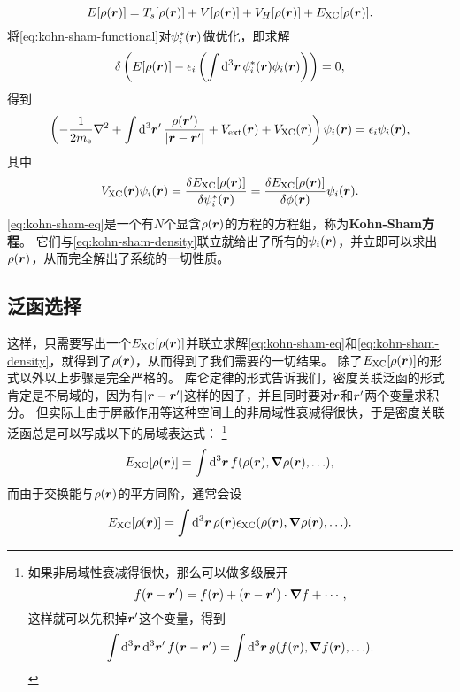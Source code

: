 \documentclass[hyperref, UTF8, a4paper]{ctexart}
\begin{document}
\begin{equation}
    E[\rho(\vb*{r})] = T_s[\rho(\vb*{r})] + V[\rho(\vb*{r})] + V_H[\rho(\vb*{r})] + E_\text{XC} [\rho(\vb*{r})].
    \label{eq:kohn-sham-functional}
\end{equation}
将\eqref{eq:kohn-sham-functional}对$\psi_i^*(\vb*{r})$做优化，即求解
\[
    \var \left( E[\rho(\vb*{r})] - \epsilon_i \left( \int \dd[3]{\vb*{r}} \phi_i^*(\vb*{r}) \phi_i(\vb*{r}) \right) \right) = 0,
\]
得到
\begin{equation}
    \left( - \frac{1}{2 m_\text{e}} \laplacian + \int \dd[3]{\vb*{r}'} \frac{\rho(\vb*{r}')}{\abs{\vb*{r} - \vb*{r}'}} + V_\text{ext}(\vb*{r}) + V_\text{XC}(\vb*{r}) \right) \psi_i(\vb*{r}) = \epsilon_i \psi_i(\vb*{r}),
    \label{eq:kohn-sham-eq}
\end{equation}
其中
\begin{equation}
    V_\text{XC}(\vb*{r}) \psi_i(\vb*{r}) = \fdv{E_\text{XC}[\rho(\vb*{r})]}{\psi^*_i(\vb*{r})} = \fdv{E_\text{XC}[\rho(\vb*{r})]}{\phi(\vb*{r})} \psi_i(\vb*{r}).
\end{equation}
\eqref{eq:kohn-sham-eq}是一个有$N$个显含$\rho(\vb*{r})$的方程的方程组，称为\textbf{Kohn-Sham方程}。
它们与\eqref{eq:kohn-sham-density}联立就给出了所有的$\psi_i(\vb*{r})$，并立即可以求出$\rho(\vb*{r})$，从而完全解出了系统的一切性质。

\subsection{泛函选择}

这样，只需要写出一个$E_\text{XC}[\rho(\vb*{r})]$并联立求解\eqref{eq:kohn-sham-eq}和\eqref{eq:kohn-sham-density}，就得到了$\rho(\vb*{r})$，从而得到了我们需要的一切结果。
除了$E_\text{XC}[\rho(\vb*{r})]$的形式以外以上步骤是完全严格的。
库仑定律的形式告诉我们，密度关联泛函的形式肯定是不局域的，因为有$\abs{\vb*{r} - \vb*{r}'}$这样的因子，并且同时要对$\vb*{r}$和$\vb*{r}'$两个变量求积分。
但实际上由于屏蔽作用等这种空间上的非局域性衰减得很快，于是密度关联泛函总是可以写成以下的局域表达式：%
\footnote{
    如果非局域性衰减得很快，那么可以做多级展开
    \[
        f(\vb*{r} - \vb*{r}') = f(\vb*{r}) + (\vb*{r} - \vb*{r}') \cdot \grad{f} + \cdots,
    \]
    这样就可以先积掉$\vb*{r}'$这个变量，得到
    \[
        \int \dd[3]{\vb*{r}} \dd[3]{\vb*{r}'} f(\vb*{r} - \vb*{r}') = \int \dd[3]{\vb*{r}} g(f(\vb*{r}), \grad{f(\vb*{r})}, \ldots).
    \]
}%
\[
    E_\text{XC}[\rho(\vb*{r})] = \int \dd[3]{\vb*{r}} f(\rho(\vb*{r}), \grad{\rho(\vb*{r})}, \ldots),
\]
而由于交换能与$\rho(\vb*{r})$的平方同阶，通常会设
\begin{equation}
    E_\text{XC}[\rho(\vb*{r})] = \int \dd[3]{\vb*{r}} \rho(\vb*{r}) \epsilon_\text{XC}(\rho(\vb*{r}), \grad{\rho(\vb*{r})}, \ldots).
\end{equation}
\end{document}
